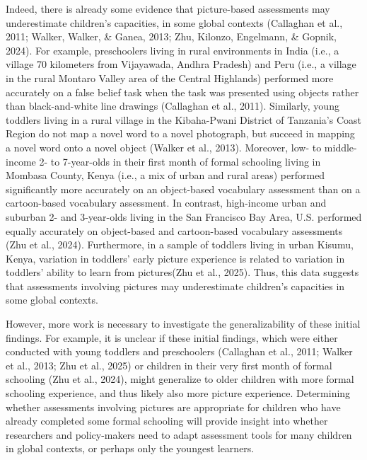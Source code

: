 \documentclass[10pt, letterpaper]{article}
\begin{document}
Indeed, there is already some evidence that picture-based assessments
may underestimate children's capacities, in some global contexts
(Callaghan et al., 2011; Walker, Walker, \& Ganea, 2013; Zhu, Kilonzo,
Engelmann, \& Gopnik, 2024). For example, preschoolers living in rural
environments in India (i.e., a village 70 kilometers from Vijayawada,
Andhra Pradesh) and Peru (i.e., a village in the rural Montaro Valley
area of the Central Highlands) performed more accurately on a false
belief task when the task was presented using objects rather than
black-and-white line drawings (Callaghan et al., 2011). Similarly, young
toddlers living in a rural village in the Kibaha-Pwani District of
Tanzania's Coast Region do not map a novel word to a novel photograph,
but succeed in mapping a novel word onto a novel object (Walker et al.,
2013). Moreover, low- to middle-income 2- to 7-year-olds in their first
month of formal schooling living in Mombasa County, Kenya (i.e., a mix
of urban and rural areas) performed significantly more accurately on an
object-based vocabulary assessment than on a cartoon-based vocabulary
assessment. In contrast, high-income urban and suburban 2- and
3-year-olds living in the San Francisco Bay Area, U.S. performed equally
accurately on object-based and cartoon-based vocabulary assessments (Zhu
et al., 2024). Furthermore, in a sample of toddlers living in urban
Kisumu, Kenya, variation in toddlers' early picture experience is
related to variation in toddlers' ability to learn from pictures(Zhu et
al., 2025). Thus, this data suggests that assessments involving pictures
may underestimate children's capacities in some global contexts.

However, more work is necessary to investigate the generalizability of
these initial findings. For example, it is unclear if these initial
findings, which were either conducted with young toddlers and
preschoolers (Callaghan et al., 2011; Walker et al., 2013; Zhu et al.,
2025) or children in their very first month of formal schooling (Zhu et
al., 2024), might generalize to older children with more formal
schooling experience, and thus likely also more picture experience.
Determining whether assessments involving pictures are appropriate for
children who have already completed some formal schooling will provide
insight into whether researchers and policy-makers need to adapt
assessment tools for many children in global contexts, or perhaps only
the youngest learners.
\end{document}
